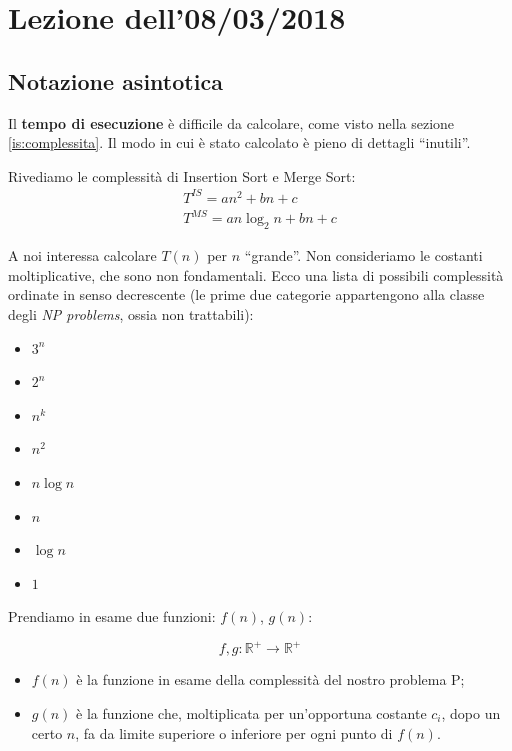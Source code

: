 \section{Lezione dell'08/03/2018}

\subsection{Notazione asintotica}
Il \textbf{tempo di esecuzione} è difficile da calcolare, come visto nella sezione \ref{is:complessita}. 
Il modo in cui è stato calcolato è pieno di dettagli ``inutili''.\par
Rivediamo le complessità di Insertion Sort e Merge Sort:
\begin{gather*}
	T^{IS} = an^2 + bn + c \\
	T^{MS} = an \log_2 n + bn + c
\end{gather*}

A noi interessa calcolare $T(n)$ per $n$ ``grande''. Non consideriamo le costanti moltiplicative, che sono non fondamentali. Ecco una lista di possibili complessità ordinate in senso decrescente (le prime due categorie appartengono alla classe degli \emph{NP problems}, ossia non trattabili):

\begin{itemize}[noitemsep]
	\item $3^n$
	\item $2^n$
	\medskip
	\item $n^k$
	\item $n^2$
	\item $n \log n$
	\item $n$
	\item $\log n$
	\item $1$
\end{itemize}

Prendiamo in esame due funzioni: $f(n)$, $g(n)$:

\begin{displaymath}
f, g: \mathbb{R}^+ \rightarrow \mathbb{R}^+
\end{displaymath}

\begin{itemize}
	\item $f(n)$ è la funzione in esame della complessità del nostro problema P;
	\item $g(n)$ è la funzione che, moltiplicata per un'opportuna costante $c_i$, dopo un certo $n$, fa da 
	limite superiore o inferiore per ogni punto di $f(n)$.
\end{itemize}
\newpage
